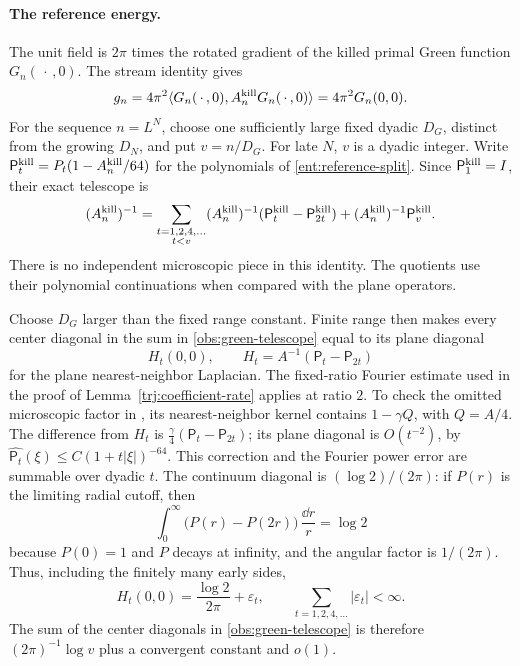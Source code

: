 \paragraph{The reference energy.}
The unit field is \(2\pi\) times the rotated gradient of the killed
primal Green function \(G_n(\,\cdot\,,0)\).  The stream identity gives
\begin{equation}\label{obs:stream-energy}
 g_n=4\pi^2\langle G_n(\,\cdot\,,0),
                 A_n^{\rm kill}G_n(\,\cdot\,,0)\rangle
     =4\pi^2G_n(0,0).
\end{equation}
For the sequence \(n=L^N\), choose one sufficiently large fixed dyadic
\(D_G\), distinct from the growing \(D_N\), and put \(v=n/D_G\).
For late \(N\), \(v\) is a dyadic integer.  Write
\(\mathsf P_t^{\rm kill}=P_t(1-A_n^{\rm kill}/64)\) for the
polynomials of \eqref{ent:reference-split}.  Since
\(\mathsf P_1^{\rm kill}=I\), their exact telescope is
\begin{equation}\label{obs:green-telescope}
 (A_n^{\rm kill})^{-1}
 =\sum_{\substack{t=1,2,4,\ldots\\t<v}}
     (A_n^{\rm kill})^{-1}
       (\mathsf P_t^{\rm kill}-\mathsf P_{2t}^{\rm kill})
       +(A_n^{\rm kill})^{-1}\mathsf P_v^{\rm kill}.
\end{equation}
There is no independent microscopic piece in this identity.
The quotients use their polynomial continuations when compared with
the plane operators.

Choose \(D_G\) larger than the fixed range constant.  Finite range
then makes every center diagonal in the sum in
\eqref{obs:green-telescope} equal to its plane diagonal
\[
 H_t(0,0),\qquad H_t=A^{-1}(\mathsf P_t-\mathsf P_{2t})
\]
for the plane nearest-neighbor Laplacian.  The fixed-ratio Fourier
estimate used in the proof of Lemma~\ref{trj:coefficient-rate}
applies at ratio \(2\).  To check the omitted microscopic factor in
\cite[Lemma~8.1]{B}, its nearest-neighbor kernel contains
\(1-\gamma Q\), with \(Q=A/4\).  The difference from \(H_t\) is
\(\frac{\gamma}{4}(\mathsf P_t-\mathsf P_{2t})\); its plane diagonal
is \(O(t^{-2})\), by
\(\widehat{\mathsf P_t}(\xi)\le C(1+t|\xi|)^{-64}\).
This correction and the Fourier power error are summable over dyadic
\(t\).  The continuum diagonal is \((\log 2)/(2\pi)\): if \(P(r)\)
is the limiting radial cutoff, then
\[
 \int_0^\infty\bigl(P(r)-P(2r)\bigr)\,\frac{\dd r}{r}=\log 2
\]
because \(P(0)=1\) and \(P\) decays at infinity, and the angular
factor is \(1/(2\pi)\).  Thus, including the finitely many early sides,
\[
 H_t(0,0)=\frac{\log 2}{2\pi}+\varepsilon_t,\qquad
             \sum_{t=1,2,4,\ldots}|\varepsilon_t|<\infty.
\]
The sum of the center diagonals in \eqref{obs:green-telescope} is
therefore \((2\pi)^{-1}\log v\) plus a convergent constant and \(o(1)\).

